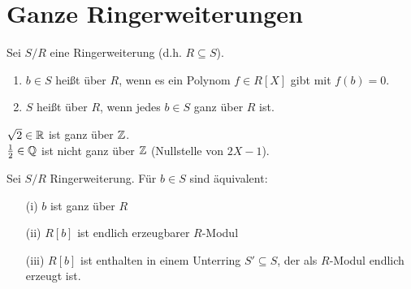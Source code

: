 \documentclass[a4paper, 10pt]{report}
\begin{document}
\section{Ganze Ringerweiterungen}

\begin{Def} 
  Sei $S/R$ eine Ringerweiterung (d.h. $R \subseteq S$).
  \begin{enumerate} 
    \item $b \in S$ heißt  über $R$, wenn es ein 
          Polynom $f \in R[X]$ gibt mit $f(b) = 0$.
    \item $S$ heißt  über $R$, wenn jedes
    $b \in S$ ganz über $R$ ist.
\end{enumerate}
\end{Def}

\begin{nnBsp} 
  $\sqrt{2} \in \mathbb{R}$ ist ganz über $\mathbb{Z}$.\\
  $\frac{1}{2} \in \mathbb{Q}$ ist nicht ganz über $\mathbb{Z}$ (Nullstelle von
  $2X -1$).
\end{nnBsp}

\begin{Prop}
\label{2.7}
  Sei $S/R$ Ringerweiterung. Für $b \in S$ sind äquivalent:
  \begin{enumerate} 
    \item[(i)] $b$ ist ganz über $R$
    \item[(ii)] $R[b]$ ist endlich erzeugbarer $R$-Modul
    \item[(iii)] $R[b]$ ist enthalten in einem Unterring $S' \subseteq S$, der
                 als $R$-Modul endlich erzeugt ist.
\end{enumerate}
\end{Prop}
\end{document}
